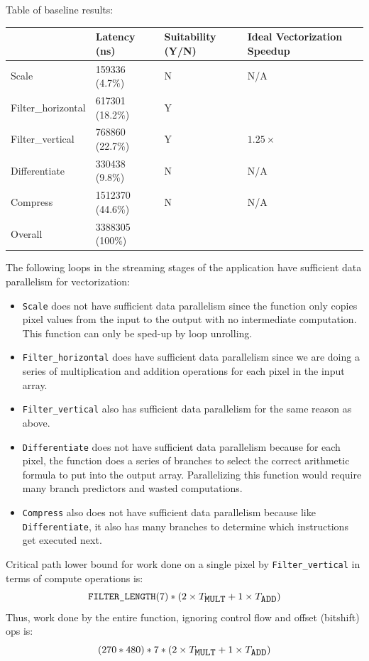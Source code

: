 \documentclass[
  course = {{ESE532 System-on-a-Chip}},
  quartile = {{}},
  assignment = 4,
  name = {{Sheil Sarda, Kate Ballard}},
  studentnumber = {{}},
  email = {{sheils@seas.upenn.edu, kballard@seas.upenn.edu}},
  firstexercise = 1
]{aga-homework}
\begin{document}
\exercise
\subexercise Table of baseline results:
\begin{table}[h]
	\centering
	\begin{tabular}{|l|l|l|l|}
		\hline
		& Latency (ns) & Suitability (Y/N) & Ideal Vectorization Speedup \\ \hline
		Scale & 159336 (4.7\%) & N & N/A \\ \hline
		Filter\_horizontal & 617301 (18.2\%) & Y &  \\ \hline
		Filter\_vertical & 768860 (22.7\%)& Y & $1.25\times$ \\ \hline
		Differentiate & 330438 (9.8\%) & N & N/A \\ \hline
		Compress & 1512370 (44.6\%)  & N & N/A \\ \hline
		Overall & 3388305 (100\%) &  &  \\ \hline
	\end{tabular}
\end{table}


\subexercise
The following loops in the streaming stages of the application have sufficient data parallelism for vectorization:
\begin{itemize}
\item \verb|Scale| does not have sufficient data parallelism since the function only copies pixel values from the input to the output with no intermediate computation. This function can only be sped-up by loop unrolling. 
\item \verb|Filter_horizontal| does have sufficient data parallelism since we are doing a series of multiplication and addition operations for each pixel in the input array. 
\item \verb|Filter_vertical| also has sufficient data parallelism for the same reason as above.
\item \verb|Differentiate| does not have sufficient data parallelism because for each pixel, the function does a series of branches to select the correct arithmetic formula to put into the output array. Parallelizing this function would require many branch predictors and wasted computations.
\item \verb|Compress| also does not have sufficient data parallelism because like \verb|Differentiate|, it also has many branches to determine which instructions get executed next. 
\end{itemize}
\subexercise
Critical path lower bound for work done on a single pixel by \verb|Filter_vertical| in terms of compute operations is:
$$ \verb|FILTER_LENGTH| (7) * (2 \times T_{\verb|MULT|} + 1 \times T_{\verb|ADD|})$$
Thus, work done by the entire function, ignoring control flow and offset (bitshift) ops is:
$$ (270 * 480) * 7 * (2 \times T_{\verb|MULT|} + 1 \times T_{\verb|ADD|})$$
\end{document}
